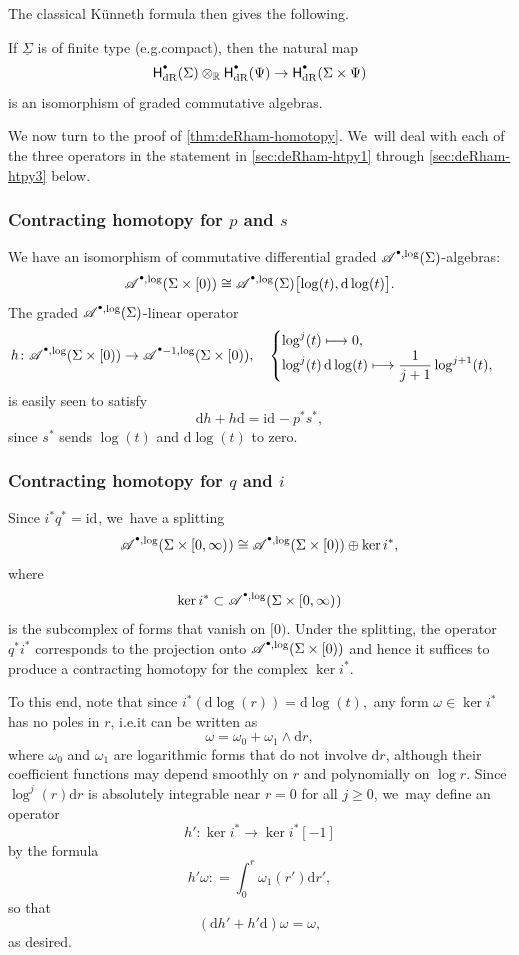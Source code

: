 \documentclass[10pt]{amsart}
\let\oldbullet\bullet
\renewcommand{\bullet}{{\raisebox{1pt}{$\scriptscriptstyle\oldbullet$}}}
\newcommand\mto{\mathchoice{\longmapsto}{\mapsto}{\mapsto}{\mapsto}}
\theoremstyle{definition}
\theoremstyle{remark}
\newcommand{\RR}{\mathbb{R}}
\newcommand{\halfspc}[1]{[0,\infty)^{#1}}
\newcommand{\id}[1]{\mathrm{id}_{#1}}
\renewcommand{\ge}{\geqslant}
\newcommand{\defas}{\mathrel{\mathop:}=}
\newcommand{\dd}{\mathrm{d}}
\newcommand{\Alog}[2][\bullet]{\mathscr{A}^{#1,\log}(#2)}
\newcommand{\Sig}{\Sigma}
\newcommand{\uSig}{\underline{\Sigma}}
\newcommand{\HdR}[2][\bullet]{\mathsf{H}_{\mathrm{dR}}^{#1}(#2)}
\let\dpl\displaystyle
\providecommand{\eg}{e.g.}\providecommand{\ie}{i.e.}
\begin{document}
The classical Künneth formula then gives the following.
\begin{corollary}
If $\uSig$ is of finite type (\eg compact), then the natural map
\[
\HdR{\Sig} \otimes_\RR \HdR{\Psi} \to \HdR{\Sig\times\Psi}
\]
is an isomorphism of graded commutative algebras.
\end{corollary}

We now turn to the proof of \autoref{thm:deRham-homotopy}. We~will deal with each of the three operators in the statement in \autoref{sec:deRham-htpy1} through \autoref{sec:deRham-htpy3} below.

\subsubsection{Contracting homotopy for $p$ and $s$}\label{sec:deRham-htpy1}
We have an isomorphism of commutative differential graded $\Alog{\Sig}$-algebras:
\[
\Alog{\Sig\times[0)} \cong \Alog{\Sig}\bigl[\log(t), \dd\log(t)\bigr].
\]
The graded $\Alog{\Sig}$-linear operator
\[
h \colon \Alog{\Sig\times[0)} \to \Alog[\bullet-1]{\Sig\times[0)}, \quad \begin{cases} \dpl\log^j(t)\mto 0, \\ \dpl\log^j(t)\,\dd\log(t) \mto \frac{1}{j+1}\log^{j+1}(t), \end{cases}
\]
is easily seen to satisfy
\[
\dd h + h \dd = \id{} - p^*s^*,
\]
since $s^*$ sends $\log(t)$ and $\dd\log(t)$ to zero.

\subsubsection{Contracting homotopy for $q$ and $i$}\label{sec:deRham-htpy2}

Since $i^*q^* = \id{}$, we~have a splitting
\[
\Alog{\Sig \times \halfspc{}} \cong \Alog{\Sig\times[0)} \oplus \ker i^*,
\]
where
\[
\ker i^* \subset \Alog{\Sig\times\halfspc{}}
\]
is the subcomplex of forms that vanish on $[0)$. Under the splitting, the operator $q^*i^*$ corresponds to the projection onto $\Alog{\Sig\times[0)}$ and hence it suffices to produce a contracting homotopy for the complex $\ker i^*$.

To this end, note that since $i^* (\dd\log(r))=\dd\log(t),$ any form $\omega \in \ker i^*$ has no poles in $r$, \ie it can be written as
\[
\omega = \omega_0 + \omega_1\wedge \dd r,
\]
where $\omega_0$ and $\omega_1$ are logarithmic forms that do not involve $\dd r$, although their coefficient functions may depend smoothly on $r$ and polynomially on $\log r$. Since $\log^j(r)\dd r$ is absolutely integrable near $r=0$ for all $j\ge 0$, we~may define an operator
\[
h' \colon \ker i^* \to \ker i^*[-1]
\]
by the formula
\[
h'\omega \defas \int_0^r \omega_1(r') \dd r',
\]
so that
\[
(\dd h' + h' \dd )\omega = \omega,
\]
as desired.
\end{document}
